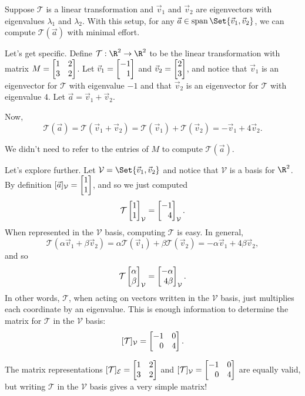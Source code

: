 
Suppose $\mathcal T$ is a linear transformation and $\vec v_1$ and $\vec v_2$ are eigenvectors
with eigenvalues $\lambda_1$ and $\lambda_2$. With this setup, for any $\vec a\in\Span\Set{\vec v_1,\vec v_2}$,
we can compute $\mathcal T(\vec a)$ with minimal effort.

Let's get specific. Define $\mathcal T:\R^2\to\R^2$
to be the linear transformation with matrix $M=\mat{1&2\\3&2}$. Let $\vec v_1=\mat{-1\\1}$ and $\vec v_2=\mat{2\\3}$,
and notice that $\vec v_1$ is an eigenvector for $\mathcal T$ with eigenvalue $-1$ and that $\vec v_2$ is an
eigenvector for $\mathcal T$ with eigenvalue $4$. Let $\vec a=\vec v_1+\vec v_2$.

Now,
\[
	\mathcal T(\vec a)=\mathcal T(\vec v_1+\vec v_2)=\mathcal T(\vec v_1)+\mathcal T(\vec v_2)=-\vec v_1+4\vec v_2.
\]

We didn't need to refer to the entries of $M$ to compute $\mathcal T(\vec a)$.

Let's explore further. Let $\mathcal V=\Set{\vec v_1,\vec v_2}$ and notice that $\mathcal V$ is a basis
for $\R^2$. By definition $[\vec a]_{\mathcal V}=\mat{1\\1}$, and so we just computed
\[
	\mathcal T\mat{1\\1}_{\mathcal V} = \mat{-1\\4}_{\mathcal V}.
\]
When represented in the $\mathcal V$ basis, computing $\mathcal T$ is easy. In general,
\[
	\mathcal T(\alpha\vec v_1+\beta\vec v_2)=\alpha\mathcal T(\vec v_1)+\beta\mathcal T(\vec v_2)=-\alpha\vec v_1+4\beta\vec v_2,
\]
and so
\[
	\mathcal T\mat{\alpha\\\beta}_{\mathcal V} = \mat{-\alpha\\4\beta}_{\mathcal V}.
\]
In other words, $\mathcal T$, when acting on vectors written in the $\mathcal V$ basis, just multiplies each coordinate
by an eigenvalue. This is enough information to determine the matrix for $\mathcal T$ in the $\mathcal V$ basis:
\[
	[\mathcal T]_{\mathcal V}=\mat{-1&0\\0&4}.
\]

The matrix representations $[\mathcal T]_{\mathcal E}=\mat{1&2\\3&2}$ and $[\mathcal T]_{\mathcal V}=\mat{-1&0\\0&4}$
are equally valid, but writing $\mathcal T$ in the $\mathcal V$ basis gives a very simple matrix!


